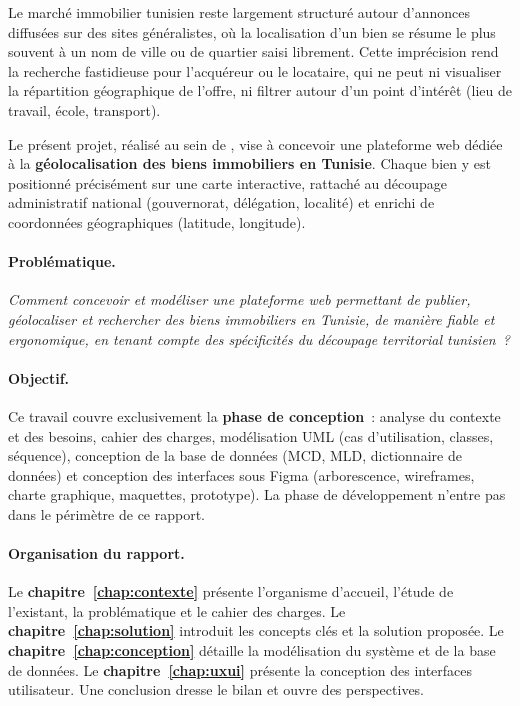 
Le marché immobilier tunisien reste largement structuré autour d'annonces
diffusées sur des sites généralistes, où la localisation d'un bien se résume le
plus souvent à un nom de ville ou de quartier saisi librement. Cette imprécision
rend la recherche fastidieuse pour l'acquéreur ou le locataire, qui ne peut ni
visualiser la répartition géographique de l'offre, ni filtrer autour d'un point
d'intérêt (lieu de travail, école, transport).

Le présent projet, réalisé au sein de \rapportEntreprise, vise à concevoir une
plateforme web dédiée à la \textbf{géolocalisation des biens immobiliers en
Tunisie}. Chaque bien y est positionné précisément sur une carte interactive,
rattaché au découpage administratif national (gouvernorat, délégation, localité)
et enrichi de coordonnées géographiques (latitude, longitude).

\paragraph{Problématique.}
\emph{Comment concevoir et modéliser une plateforme web permettant de publier,
géolocaliser et rechercher des biens immobiliers en Tunisie, de manière fiable et
ergonomique, en tenant compte des spécificités du découpage territorial
tunisien~?}

\paragraph{Objectif.}
Ce travail couvre exclusivement la \textbf{phase de conception}~: analyse du
contexte et des besoins, cahier des charges, modélisation UML (cas d'utilisation,
classes, séquence), conception de la base de données (MCD, MLD, dictionnaire de
données) et conception des interfaces sous Figma (arborescence, wireframes,
charte graphique, maquettes, prototype). La phase de développement n'entre pas
dans le périmètre de ce rapport.

\paragraph{Organisation du rapport.}
Le \textbf{chapitre~\ref{chap:contexte}} présente l'organisme d'accueil, l'étude
de l'existant, la problématique et le cahier des charges. Le
\textbf{chapitre~\ref{chap:solution}} introduit les concepts clés et la solution
proposée. Le \textbf{chapitre~\ref{chap:conception}} détaille la modélisation du
système et de la base de données. Le \textbf{chapitre~\ref{chap:uxui}} présente
la conception des interfaces utilisateur. Une conclusion dresse le bilan et
ouvre des perspectives.
